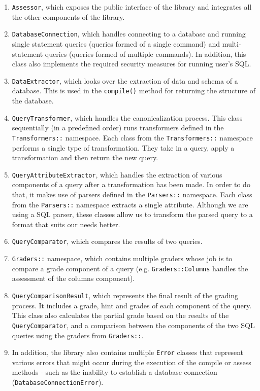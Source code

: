 \begin{enumerate}
    \item \texttt{Assessor}, which exposes the public interface of the library and integrates all the other components of the library.
    \item \texttt{DatabaseConnection}, which handles connecting to a database and running single statement queries (queries formed of a single command) and multi-statement queries (queries formed of multiple commands). In addition, this class also implements the required security measures for running user's SQL.
    \item \texttt{DataExtractor}, which looks over the extraction of data and schema of a database. This is used in the \texttt{compile()} method for returning the structure of the database.
    \item \texttt{QueryTransformer}, which handles the canonicalization process. This class sequentially (in a predefined order) runs transformers defined in the \texttt{Transformers::} namespace. Each class from the \texttt{Transformers::} namespace performs a single type of transformation. They take in a query, apply a transformation and then return the new query.
    \item \texttt{QueryAttributeExtractor}, which handles the extraction of various components of a query after a transformation has been made. In order to do that, it makes use of parsers defined in the \texttt{Parsers::} namespace. Each class from the \texttt{Parsers::} namespace extracts a single attribute. Although we are using a SQL parser, these classes allow us to transform the parsed query to a format that suits our needs better.
    \item \texttt{QueryComparator}, which compares the results of two queries.
    \item \texttt{Graders::} namespace, which contains multiple graders whose job is to compare a grade component of a query (e.g. \texttt{Graders::Columns} handles the assessment of the columns component).
    \item \texttt{QueryComparisonResult}, which represents the final result of the grading process. It includes a grade, hint and grades of each component of the query. This class also calculates the partial grade based on the results of the \texttt{QueryComparator}, and a comparison between the components of the two SQL queries using the graders from \texttt{Graders::}.
    \item In addition, the library also contains multiple \texttt{Error} classes that represent various errors that might occur during the execution of the compile or assess methods - such as the inability to establish a database connection (\texttt{DatabaseConnectionError}).
\end{enumerate}


